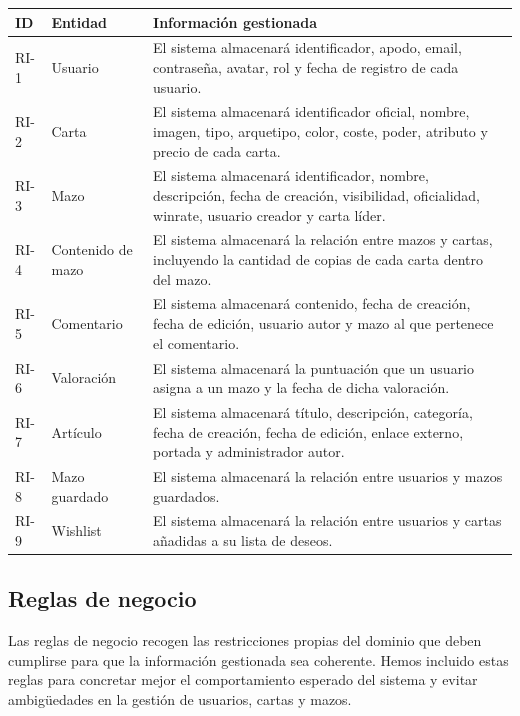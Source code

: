 \documentclass[10pt]{article}
\begin{document}
                \noindent
                \begin{xltabular}{\textwidth}{|l|l|X|}
                	\hline
                	 \textbf{ID} & \textbf{Entidad} & \textbf{Información gestionada} \\ \hline
                	
                	RI-1 & Usuario & El sistema almacenará identificador, apodo, email, contraseña, avatar, rol y fecha de registro de cada usuario. \\ \hline
                	RI-2 & Carta & El sistema almacenará identificador oficial, nombre, imagen, tipo, arquetipo, color, coste, poder, atributo y precio de cada carta. \\ \hline
                	RI-3 & Mazo & El sistema almacenará identificador, nombre, descripción, fecha de creación, visibilidad, oficialidad, winrate, usuario creador y carta líder. \\ \hline
                	RI-4 & Contenido de mazo & El sistema almacenará la relación entre mazos y cartas, incluyendo la cantidad de copias de cada carta dentro del mazo. \\ \hline
                	RI-5 & Comentario & El sistema almacenará contenido, fecha de creación, fecha de edición, usuario autor y mazo al que pertenece el comentario. \\ \hline
                	RI-6 & Valoración & El sistema almacenará la puntuación que un usuario asigna a un mazo y la fecha de dicha valoración. \\ \hline
                	RI-7 & Artículo & El sistema almacenará título, descripción, categoría, fecha de creación, fecha de edición, enlace externo, portada y administrador autor. \\ \hline
                	RI-8 & Mazo guardado & El sistema almacenará la relación entre usuarios y mazos guardados. \\ \hline
                	RI-9 & Wishlist & El sistema almacenará la relación entre usuarios y cartas añadidas a su lista de deseos. \\ \hline
                	
                \end{xltabular}

        \subsection{Reglas de negocio}
            Las reglas de negocio recogen las restricciones propias del dominio que deben cumplirse para que la información gestionada sea coherente. Hemos incluido estas reglas para concretar mejor el comportamiento esperado del sistema y evitar ambigüedades en la gestión de usuarios, cartas y mazos.
            
\end{document}
